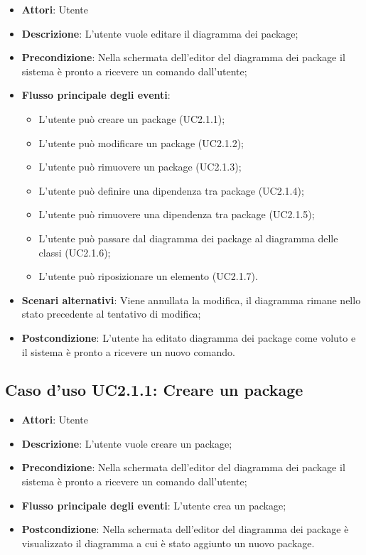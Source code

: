 \documentclass[../AnalisiDeiRequisiti.tex]{subfiles}
\begin{document}
	\begin{itemize}
		\item \textbf{Attori}: Utente
		\item \textbf{Descrizione}: L'utente vuole editare il diagramma dei package;
		\item \textbf{Precondizione}: Nella schermata dell'editor del diagramma dei package il sistema è pronto a ricevere un comando dall'utente;
		\item \textbf{Flusso principale degli eventi}: \begin{itemize}
			\item L'utente può creare un package (UC2.1.1);
			\item L'utente può modificare un package (UC2.1.2);
			\item L'utente può rimuovere un package (UC2.1.3);
			\item L'utente può definire una dipendenza tra package (UC2.1.4);
			\item L'utente può rimuovere una dipendenza tra package (UC2.1.5);
			\item L'utente può passare dal diagramma dei package al diagramma delle classi (UC2.1.6);
			\item L'utente può riposizionare un elemento (UC2.1.7).
		\end{itemize}
		\item \textbf{Scenari alternativi}: Viene annullata la modifica, il diagramma rimane nello stato precedente al tentativo di modifica;
		\item \textbf{Postcondizione}: L'utente ha editato diagramma dei package come voluto e il sistema è pronto a ricevere un nuovo comando.
	\end{itemize}
	\subsection{Caso d'uso UC2.1.1: Creare un package}
	\begin{itemize}
		\item \textbf{Attori}: Utente
		\item \textbf{Descrizione}: L'utente vuole creare un package;
		\item \textbf{Precondizione}: Nella schermata dell'editor del diagramma dei package il sistema è pronto a ricevere un comando dall'utente;
		\item \textbf{Flusso principale degli eventi}: L'utente crea un package;
		\item \textbf{Postcondizione}: Nella schermata dell'editor del diagramma dei package è visualizzato il diagramma a cui è stato aggiunto un nuovo package.
	\end{itemize}
\end{document}
